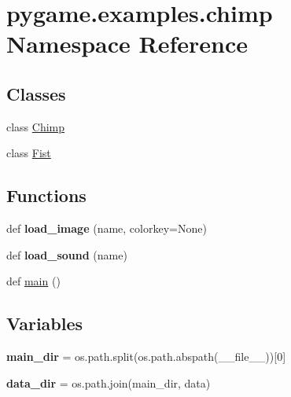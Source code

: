 \hypertarget{namespacepygame_1_1examples_1_1chimp}{}\section{pygame.\+examples.\+chimp Namespace Reference}
\label{namespacepygame_1_1examples_1_1chimp}
\subsection*{Classes}
\begin{DoxyCompactItemize}
\item 
class \hyperlink{classpygame_1_1examples_1_1chimp_1_1_chimp}{Chimp}
\item 
class \hyperlink{classpygame_1_1examples_1_1chimp_1_1_fist}{Fist}
\end{DoxyCompactItemize}
\subsection*{Functions}
\begin{DoxyCompactItemize}
\item 
\mbox{\label{namespacepygame_1_1examples_1_1chimp_a75b77d9133136646c42becc99f6d7967}} 
def {\bfseries load\+\_\+image} (name, colorkey=None)
\item 
\mbox{\label{namespacepygame_1_1examples_1_1chimp_a9a08404fc5becd56092da10b4ed79c3f}} 
def {\bfseries load\+\_\+sound} (name)
\item 
def \hyperlink{namespacepygame_1_1examples_1_1chimp_a9c5b41a34dd2dff9ce14afe12d6968f7}{main} ()
\end{DoxyCompactItemize}
\subsection*{Variables}
\begin{DoxyCompactItemize}
\item 
\mbox{\label{namespacepygame_1_1examples_1_1chimp_a0afb89d68649092175fb91518ccc5bd5}} 
{\bfseries main\+\_\+dir} = os.\+path.\+split(os.\+path.\+abspath(\+\_\+\+\_\+file\+\_\+\+\_\+))\mbox{[}0\mbox{]}
\item 
\mbox{\label{namespacepygame_1_1examples_1_1chimp_a37e9256fb12b5efc5633e090e02be523}} 
{\bfseries data\+\_\+dir} = os.\+path.\+join(main\+\_\+dir, \textquotesingle{}data\textquotesingle{})
\end{DoxyCompactItemize}


